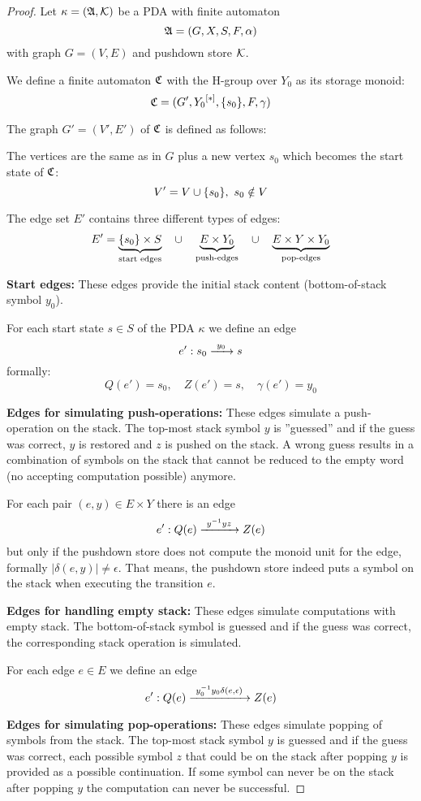 \begin{proof}
Let $\kappa = (\mbox{$\mathfrak{A}$}, \mbox{$\mathcal{K}$})$ be a PDA with finite automaton
\[ \mbox{$\mathfrak{A}$} = (G, X, S, F, \alpha) \]
with graph $G = (V, E)$ and pushdown store $\mbox{$\mathcal{K}$}$.

We define a finite automaton $\mbox{$\mathfrak{C}$}$ with the H-group over $Y_0$ as its storage
monoid:
\[ \mbox{$\mathfrak{C}$} = (G', \mbox{${Y_0}^{[*]}$}, \mbox{$\{s_0\}$}, F, \gamma) \]

The graph $G'=(V',E')$ of $\mbox{$\mathfrak{C}$}$ is defined as follows:

The vertices are the same as in $G$ plus a new vertex $s_0$ which becomes the
start state of $\mbox{$\mathfrak{C}$}$:
\[ V' = V \cup \mbox{$\{s_0\}$},\ s_0 \notin V \]

The edge set $E'$ contains three different types of edges:
\[ E' = \underbrace{\mbox{$\{s_0\}$} \times S}_{\text{start edges}} \quad\cup\quad
\underbrace{E \times Y_0}_{\text{push-edges}} \quad\cup\quad \underbrace{E
\times Y \times Y_0}_{\text{pop-edges}}
\]

{\bf Start edges:} These edges provide the initial
stack content (bottom-of-stack symbol $y_0$).

For each start state $s \in S$ of the PDA $\kappa$ we define an edge
\[ e': s_0 \xrightarrow{\ {y_0}\ } s\]
formally:
\[ Q(e') = s_0,\quad Z(e') = s,\quad \gamma(e') = y_0 \]

\bigskip
{\bf Edges for simulating push-operations:} These edges simulate a
push-operation on the stack.
The top-most stack symbol $y$ is ''guessed'' and if the guess was correct, $y$ is
restored and $z$ is pushed on the stack. A wrong guess results in a combination of symbols on 
the stack that cannot be reduced to the empty word (no accepting computation
possible) anymore.
 
For each pair $(e, y) \in E \times Y$ there is an edge
\[ e': Q(e) \xrightarrow{\ {y^{-1} y z}\ } Z(e)\]
but only if the pushdown store does not compute the monoid unit for the edge,
formally $|\delta(e, y)| \neq \epsilon$. That means, the pushdown store indeed
puts a symbol on the stack when executing the transition $e$.

\bigskip
{\bf Edges for handling empty stack:} These edges simulate computations with
empty stack. The bottom-of-stack symbol is guessed and if the guess was correct, the
corresponding stack operation is simulated.

For each edge $e \in E$ we define an edge
\[ e': Q(e) \xrightarrow{\ {y_0^{-1} y_0 \delta(e, \epsilon)}\ } Z(e) \] 

\bigskip
{\bf Edges for simulating pop-operations:} These edges simulate popping of
symbols from the stack.
The top-most stack symbol $y$ is guessed and if the guess was correct, each
possible symbol $z$ that could be on the stack after popping $y$ is provided as
a possible continuation. If some symbol can never be on the stack after
popping $y$ the computation can never be successful. 


\end{proof}
